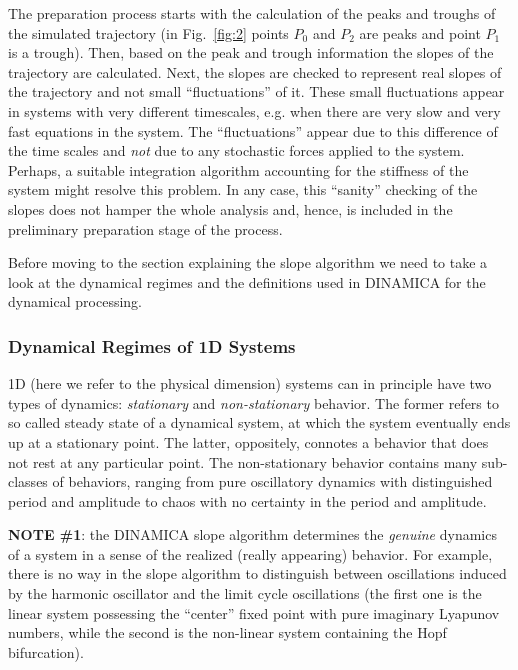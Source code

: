 \documentclass[11pt,a4paper]{article}
\begin{document}
The preparation process starts with the calculation of the peaks and troughs of the
simulated trajectory (in Fig.~\ref{fig:2} points $P_0$ and $P_2$ are peaks and point
$P_1$ is a trough). Then, based on the peak and trough information the slopes of the
trajectory are calculated. Next, the slopes are checked to represent real slopes of
the trajectory and not small ``fluctuations'' of it. These small fluctuations appear
in systems with very different timescales, e.g. when there are very slow and very
fast equations in the system. The ``fluctuations'' appear due to this difference of
the time scales and \textit{not} due to any stochastic forces applied to the
system. Perhaps, a suitable integration algorithm accounting for the stiffness of the
system might resolve this problem. In any case, this ``sanity'' checking of the
slopes does not hamper the whole analysis and, hence, is included in the preliminary
preparation stage of the process.

Before moving to the section explaining the slope algorithm we need to take a look at
the dynamical regimes and the definitions used in DINAMICA for the dynamical
processing.

\subsubsection{Dynamical Regimes of 1D Systems}
\label{sec:dynamical-regimes-1d}

1D (here we refer to the physical dimension) systems can in principle have two types
of dynamics: \textit{stationary} and \textit{non-stationary} behavior. The former
refers to so called steady state of a dynamical system, at which the system
eventually ends up at a stationary point. The latter, oppositely, connotes a behavior
that does not rest at any particular point. The non-stationary behavior contains many
sub-classes of behaviors, ranging from pure oscillatory dynamics with distinguished
period and amplitude to chaos with no certainty in the period and
amplitude.

\textbf{NOTE \#1}: the DINAMICA slope algorithm determines the \textit{genuine}
dynamics of a system in a sense of the realized (really appearing) behavior. For
example, there is no way in the slope algorithm to distinguish between oscillations
induced by the harmonic oscillator and the limit cycle oscillations (the first one is
the linear system possessing the ``center'' fixed point with pure imaginary Lyapunov
numbers, while the second is the non-linear system containing the Hopf bifurcation).
\end{document}
